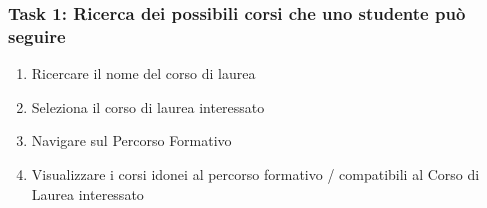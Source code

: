 \subsubsection{Task 1: Ricerca dei possibili corsi che uno studente può seguire}
\begin{enumerate}
    \item Ricercare il nome del corso di laurea
    \item Seleziona il corso di laurea interessato
    \item Navigare sul Percorso Formativo 
    \item Visualizzare i corsi idonei al percorso formativo / compatibili al Corso di Laurea interessato 
\end{enumerate}

